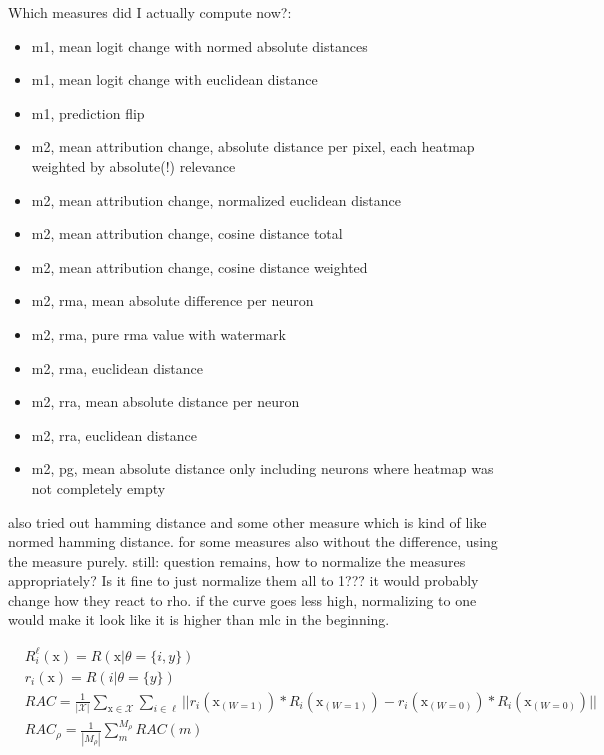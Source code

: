 Which measures did I actually compute now?:
\begin{itemize}
    \item m1, mean logit change with normed absolute distances
    \item m1, mean logit change with euclidean distance
    \item m1, prediction flip
    \item m2, mean attribution change, absolute distance per pixel, each heatmap weighted by absolute(!) relevance
    \item m2, mean attribution change, normalized euclidean distance
    \item m2, mean attribution change, cosine distance total
    \item m2, mean attribution change, cosine distance weighted
    \item m2, rma, mean absolute difference per neuron
    \item m2, rma, pure rma value with watermark
    \item m2, rma, euclidean distance
    \item m2, rra, mean absolute distance per neuron
    \item m2, rra, euclidean distance
    \item m2, pg, mean absolute distance only including neurons where heatmap was not completely empty
\end{itemize}


also tried out hamming distance and some other measure which is kind of like normed hamming distance. 
for some measures also without the difference, using the measure purely. 
still: question remains, how to normalize the measures appropriately? Is it fine to just normalize them all to 1??? it would probably change how they react to rho. if the curve goes less high, normalizing to one would make it look like it is higher than mlc in the beginning.


\begin{align*}
& R_i^{\ell}(\mathrm{x}) = R(\mathrm{x} | \theta=\{i, y\}) \\
& r_i(\mathrm{x}) = R(i | \theta=\{y\}) \\
& RAC = \frac{1}{|\mathcal{X}| }\sum_{\mathrm{x} \in \mathcal{X}} \sum_{i \in \ell} || r_i(\mathrm{x}_{(W=1)}) * R_i(\mathrm{x}_{(W=1)}) -  r_i(\mathrm{x}_{(W=0)}) * R_i(\mathrm{x}_{(W=0)})  || \\
& RAC_{\rho} = \frac{1}{|M_\rho|}\sum_{m}^{M_{\rho}} RAC(m)
\end{align*}

